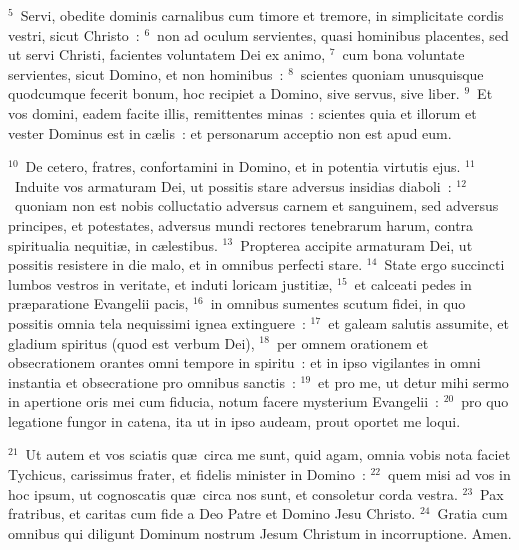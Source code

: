 ${}^{5}$~Servi, obedite dominis carnalibus cum timore et tremore, in simplicitate cordis vestri, sicut Christo~:
${}^{6}$~non ad oculum servientes, quasi hominibus placentes, sed ut servi Christi, facientes voluntatem Dei ex animo,
${}^{7}$~cum bona voluntate servientes, sicut Domino, et non hominibus~:
${}^{8}$~scientes quoniam unusquisque quodcumque fecerit bonum, hoc recipiet a Domino, sive servus, sive liber.
${}^{9}$~Et vos domini, eadem facite illis, remittentes minas~: scientes quia et illorum et vester Dominus est in c\ae lis~: et personarum acceptio non est apud eum.


${}^{10}$~De cetero, fratres, confortamini in Domino, et in potentia virtutis ejus.
${}^{11}$~Induite vos armaturam Dei, ut possitis stare adversus insidias diaboli~:
${}^{12}$~quoniam non est nobis colluctatio adversus carnem et sanguinem, sed adversus principes, et potestates, adversus mundi rectores tenebrarum harum, contra spiritualia nequiti\ae , in c\ae lestibus.
${}^{13}$~Propterea accipite armaturam Dei, ut possitis resistere in die malo, et in omnibus perfecti stare.
${}^{14}$~State ergo succincti lumbos vestros in veritate, et induti loricam justiti\ae ,
${}^{15}$~et calceati pedes in pr\ae paratione Evangelii pacis,
${}^{16}$~in omnibus sumentes scutum fidei, in quo possitis omnia tela nequissimi ignea extinguere~:
${}^{17}$~et galeam salutis assumite, et gladium spiritus (quod est verbum Dei),
${}^{18}$~per omnem orationem et obsecrationem orantes omni tempore in spiritu~: et in ipso vigilantes in omni instantia et obsecratione pro omnibus sanctis~:
${}^{19}$~et pro me, ut detur mihi sermo in apertione oris mei cum fiducia, notum facere mysterium Evangelii~:
${}^{20}$~pro quo legatione fungor in catena, ita ut in ipso audeam, prout oportet me loqui.


${}^{21}$~Ut autem et vos sciatis qu\ae\ circa me sunt, quid agam, omnia vobis nota faciet Tychicus, carissimus frater, et fidelis minister in Domino~:
${}^{22}$~quem misi ad vos in hoc ipsum, ut cognoscatis qu\ae\ circa nos sunt, et consoletur corda vestra.
${}^{23}$~Pax fratribus, et caritas cum fide a Deo Patre et Domino Jesu Christo.
${}^{24}$~Gratia cum omnibus qui diligunt Dominum nostrum Jesum Christum in incorruptione. Amen.
